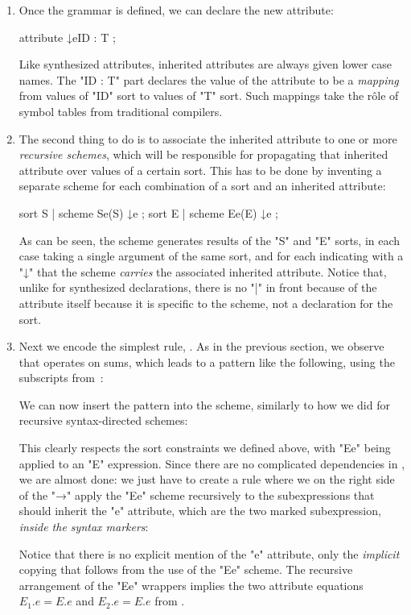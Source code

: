 \documentclass[11pt]{article} %
\begin{document}
\begin{example}
\begin{enumerate}
\item Once the grammar is defined, we can declare the new attribute:
  \begin{hacs}
   attribute ↓e{ID : T} ;
\end{hacs}
Like synthesized attributes, inherited attributes are always given lower case names.
The "{ID : T}" part declares the value of the attribute to be a \emph{mapping} from values of
"ID" sort to values of "T" sort. Such mappings take the rôle of symbol tables from traditional
compilers.

\item The second thing to do is to associate the inherited attribute to one or more \emph{recursive
    schemes}, which will be responsible for propagating that inherited attribute over values of a
  certain sort.  This has to be done by inventing a separate scheme for each combination of a sort
  and an inherited attribute:
  \begin{hacs}
   sort S | scheme Se(S) ↓e ;
   sort E | scheme Ee(E) ↓e ;
\end{hacs}
As can be seen, the scheme generates results of the "S" and "E" sorts, in each case taking a
single argument of the same sort, and for each indicating with a "↓" that the scheme
\emph{carries} the associated inherited attribute. Notice that, unlike for synthesized
declarations, there is no "|" in front because of the attribute itself because it is specific to
the scheme, not a declaration for the sort.

\item Next we encode the simplest rule, . As in the previous section, we observe that
   operates on sums, which leads to a pattern like the following, using the subscripts
  from~:
We can now insert the pattern into the scheme, similarly to how we did for recursive
syntax-directed schemes:
This clearly respects the sort constraints we defined above, with "Ee" being applied to an "E"
expression. Since there are no complicated dependencies in , we are almost done: we just
have to create a rule where we on the right side of the "→" apply the "Ee" scheme recursively to
the subexpressions that should inherit the "e" attribute, which are the two marked subexpression,
\emph{inside the syntax markers}:
Notice that there is no explicit mention of the "e" attribute, only the \emph{implicit} copying
that follows from the use of the "Ee" scheme. The recursive  arrangement of the "Ee" wrappers
implies the two attribute equations $E_1.e=E.e$ and $E_2.e=E.e$ from .


\end{enumerate}
\end{example}
\end{document}
